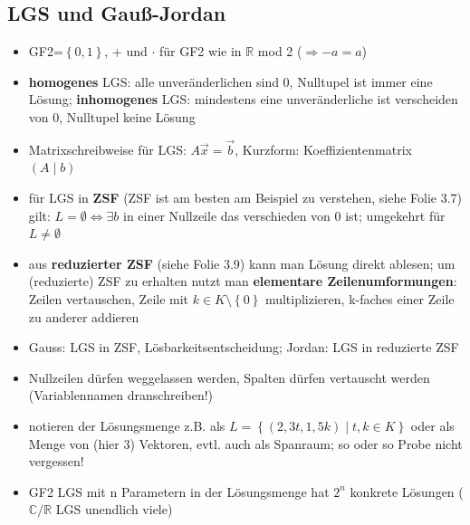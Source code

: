 \documentclass[10pt,a4paper]{article}
\begin{document}
\subsection{LGS und Gauß-Jordan}
\begin{itemize}
\item GF2=$\left\lbrace 0,1\right\rbrace$, + und $\cdot$ für GF2 wie in $\mathbb{R}$ mod 2 ($\Rightarrow -a=a$)
\item \textbf{homogenes} LGS: alle unveränderlichen sind 0, Nulltupel ist immer eine Lösung; \textbf{inhomogenes} LGS: mindestens eine unveränderliche ist verscheiden von 0, Nulltupel keine Lösung  
\item Matrixschreibweise für LGS: $A\overrightarrow{x}=\overrightarrow{b}$, Kurzform: Koeffizientenmatrix $(A \mid b)$
\item für LGS in \textbf{ZSF} (ZSF ist am besten am Beispiel zu verstehen, siehe Folie 3.7) gilt: $L=\emptyset \Leftrightarrow \exists b$ in einer Nullzeile das verschieden von 0 ist; umgekehrt für $L\neq \emptyset$
\item aus \textbf{reduzierter ZSF} (siehe Folie 3.9) kann man Lösung direkt ablesen; um (reduzierte) ZSF zu erhalten nutzt man \textbf{elementare Zeilenumformungen}: Zeilen vertauschen, Zeile mit $k\in K\setminus \left\lbrace 0\right\rbrace$ multiplizieren, k-faches einer Zeile zu anderer addieren
\item Gauss: LGS in ZSF, Lösbarkeitsentscheidung; Jordan: LGS in reduzierte ZSF
\item Nullzeilen dürfen weggelassen werden, Spalten dürfen vertauscht werden (Variablennamen dranschreiben!)
\item notieren der Lösungsmenge z.B. als $L=\left\lbrace (2,3t,1,5k)\mid t,k \in K \right\rbrace$ oder als Menge von (hier 3) Vektoren, evtl. auch als Spanraum; so oder so Probe nicht vergessen!
\item GF2 LGS mit n Parametern in der Lösungsmenge hat $2^{n}$ konkrete Lösungen ($\mathbb{C}/\mathbb{R}$ LGS unendlich viele)
\end{itemize}
\end{document}
